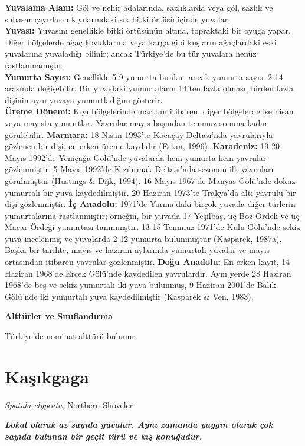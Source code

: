 \documentclass[
  a4paper,
  DIV=11,
  numbers=noendperiod]{scrreprt}
\begin{document}
\textbf{Yuvalama Alanı:} Göl ve nehir adalarında, sazlıklarda veya göl,
sazlık ve subasar çayırların kıyılarındaki sık bitki örtüsü içinde
yuvalar.\\
\textbf{Yuvası:} Yuvasını genellikle bitki örtüsünün altına, topraktaki
bir oyuğa yapar. Diğer bölgelerde ağaç kovuklarına veya karga gibi
kuşların ağaçlardaki eski yuvalarına yuvaladığı bilinir; ancak
Türkiye'de bu tür yuvalara henüz rastlanmamıştır.\\
\textbf{Yumurta Sayısı:} Genellikle 5-9 yumurta bırakır, ancak yumurta
sayısı 2-14 arasında değişebilir. Bir yuvadaki yumurtaların 14'ten fazla
olması, birden fazla dişinin aynı yuvaya yumurtladığını gösterir.\\
\textbf{Üreme Dönemi:} Kıyı bölgelerinde marttan itibaren, diğer
bölgelerde ise nisan veya mayısta yumurtlar. Yavrular mayıs başından
temmuz sonuna kadar görülebilir. \textbf{Marmara:} 18 Nisan 1993'te
Kocaçay Deltası'nda yavrularıyla gözlenen bir dişi, en erken üreme
kaydıdır (Ertan, 1996). \textbf{Karadeniz:} 19-20 Mayıs 1992'de Yeniçağa
Gölü'nde yuvalarda hem yumurta hem yavrular gözlenmiştir. 5 Mayıs
1992'de Kızılırmak Deltası'nda sezonun ilk yavruları görülmüştür
(Hustings \& Dijk, 1994). 16 Mayıs 1967'de Manyas Gölü'nde dokuz
yumurtalı bir yuva kaydedilmiştir. 20 Haziran 1973'te Trakya'da altı
yavrulu bir dişi gözlenmiştir. \textbf{İç Anadolu:} 1971'de Yarma'daki
birçok yuvada diğer türlerin yumurtalarına rastlanmıştır; örneğin, bir
yuvada 17 Yeşilbaş, üç Boz Ördek ve üç Macar Ördeği yumurtası
tanınmıştır. 13-15 Temmuz 1971'de Kulu Gölü'nde sekiz yuva incelenmiş ve
yuvalarda 2-12 yumurta bulunmuştur (Kasparek, 1987a). Başka bir tarihte,
mayıs ve haziran aylarında yumurtalı yuvalar ve mayıs ortasından
itibaren yavrular gözlenmiştir. \textbf{Doğu Anadolu:} En erken kayıt,
14 Haziran 1968'de Erçek Gölü'nde kaydedilen yavrulardır. Aynı yerde 28
Haziran 1968'de beş ve sekiz yumurtalı iki yuva bulunmuş, 9 Haziran
2001'de Balık Gölü'nde iki yumurtalı yuva kaydedilmiştir (Kasparek \&
Ven, 1983).

\textbf{Alttürler ve Sınıflandırma}

Türkiye'de nominat alttürü bulunur.

\section{Kaşıkgaga}\label{kaux15fux131kgaga}

\emph{Spatula clypeata}, Northern Shoveler

\textbf{\emph{Lokal olarak az sayıda yuvalar. Aynı zamanda yaygın olarak
çok sayıda bulunan bir geçit türü ve kış konuğudur.}}
\end{document}
